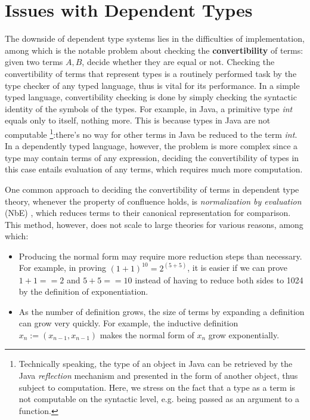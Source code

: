 \section{Issues with Dependent Types}\label{chapter:intro:issue}
The downside of dependent type systems lies in the difficulties of implementation, among which is the notable problem about checking the \textbf{convertibility} of terms: given two terms $A,B$, decide whether they are equal or not. Checking the convertibility of terms that represent types is a routinely performed task by the type checker of any typed language, thus is vital for its performance. In a simple typed language, convertibility checking is done by simply checking the syntactic identity of the symbols of the types. For example, in Java, a primitive type \emph{int} equals only to itself, nothing more. This is because types in Java are not computable \footnote{Technically speaking, the type of an object in Java can be retrieved by the Java \emph{reflection} mechanism and presented in the form of another object, thus subject to computation. Here, we stress on the fact that a type as a term is not computable on the syntactic level, e.g. being passed as an argument to a function.}:there's no way for other terms in Java be reduced to the term \emph{int}. In a dependently typed language, however, the problem is more complex since a type may contain terms of any expression, deciding the convertibility of types in this case entails evaluation of any terms, which requires much more computation.

One common approach to deciding the convertibility of terms in dependent type theory, whenever the property of confluence holds, is \textit{normalization by evaluation} (NbE) \cite{berger1998normalization}, which reduces terms to their canonical representation for comparison. This method, however, does not scale to large theories for various reasons, among which:
\begin{itemize}
\item Producing the normal form may require more reduction steps than necessary. For example, in proving $(1 + 1) ^ {10} = 2 ^{(5 + 5)}$, it is easier if we can prove $1 + 1 == 2$ and $5 + 5 == 10$ instead of having to reduce both sides to 1024 by the definition of exponentiation.
\item As the number of definition grows, the size of terms by expanding a definition can grow very quickly. For example, the inductive definition $x_n := (x_{n-1}, x_{n-1})$ makes the normal form of $x_{n}$ grow exponentially.
\end{itemize}


